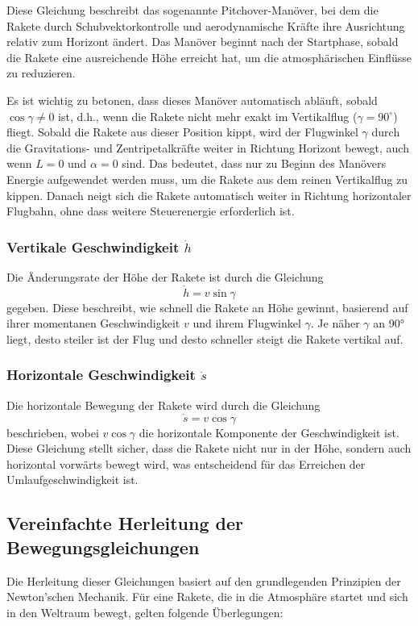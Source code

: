 Diese Gleichung beschreibt das sogenannte Pitchover-Manöver, bei dem die Rakete durch Schubvektorkontrolle und aerodynamische Kräfte ihre Ausrichtung relativ zum Horizont ändert. 
Das Manöver beginnt nach der Startphase, sobald die Rakete eine ausreichende Höhe erreicht hat, um die atmosphärischen Einflüsse zu reduzieren.

Es ist wichtig zu betonen, dass dieses Manöver automatisch abläuft, sobald \(\cos \gamma \neq 0\) ist, d.h., wenn die Rakete nicht mehr exakt im Vertikalflug (\(\gamma = 90^\circ\)) fliegt. 
Sobald die Rakete aus dieser Position kippt, wird der Flugwinkel \(\gamma\) durch die Gravitations- und Zentripetalkräfte weiter in Richtung Horizont bewegt, auch wenn \(L = 0\) und \( \alpha = 0\) sind. 
Das bedeutet, dass nur zu Beginn des Manövers Energie aufgewendet werden muss, um die Rakete aus dem reinen Vertikalflug zu kippen. 
Danach neigt sich die Rakete automatisch weiter in Richtung horizontaler Flugbahn, ohne dass weitere Steuerenergie erforderlich ist.


\subsubsection{Vertikale Geschwindigkeit \(\dot{h}\)}
Die Änderungsrate der Höhe der Rakete ist durch die Gleichung
\[
\dot{h} = v \sin \gamma
\]
gegeben. 
Diese beschreibt, wie schnell die Rakete an Höhe gewinnt, basierend auf ihrer momentanen Geschwindigkeit \(v\) und ihrem Flugwinkel \(\gamma\). 
Je näher \(\gamma\) an 90° liegt, desto steiler ist der Flug und desto schneller steigt die Rakete vertikal auf.

\subsubsection{Horizontale Geschwindigkeit \(\dot{s}\)}
Die horizontale Bewegung der Rakete wird durch die Gleichung
\[
\dot{s} = v \cos \gamma
\]
beschrieben, wobei \(v \cos \gamma\) die horizontale Komponente der Geschwindigkeit ist. 
Diese Gleichung stellt sicher, dass die Rakete nicht nur in der Höhe, sondern auch horizontal vorwärts bewegt wird, was entscheidend für das Erreichen der Umlaufgeschwindigkeit ist.

\subsection{Vereinfachte Herleitung der Bewegungsgleichungen}
Die Herleitung dieser Gleichungen basiert auf den grundlegenden Prinzipien der Newton'schen Mechanik. Für eine Rakete, die in die Atmosphäre startet und sich in den Weltraum bewegt, gelten folgende Überlegungen:

